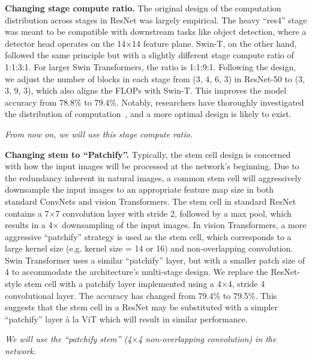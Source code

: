 \documentclass[10pt,twocolumn,letterpaper]{article}
\renewcommand{\paragraph}[1]{\vspace{1.25mm}\noindent\textbf{#1}}
\begin{document}
\paragraph{Changing stage compute ratio.} 
The original design of the computation distribution across stages in ResNet was largely empirical. The heavy ``res4'' stage was meant to be compatible with downstream tasks like object detection, where a detector head operates on the 14$\times$14 feature plane. 
Swin-T, on the other hand, followed the same principle but with a slightly different stage compute ratio of 1:1:3:1. For larger Swin Transformers, the ratio is 1:1:9:1. Following the design, we adjust the number of blocks in each stage from (3, 4, 6, 3) in ResNet-50 to (3, 3, 9, 3), which also aligns the FLOPs with Swin-T. This improves the model accuracy from 78.8\% to 79.4\%. Notably, researchers have thoroughly investigated the distribution of computation~\cite{Radosavovic2019network, Radosavovic2020designing}, and a more optimal design is likely to exist. 

\textit{From now on, we will use this stage compute ratio.} 

\paragraph{Changing stem to ``Patchify''.}
Typically, the stem cell design is concerned with how the input images will be processed at the network's beginning. Due to the redundancy inherent in natural images, a common stem cell will aggressively downsample the input images to an appropriate feature map size in both standard ConvNets and vision Transformers. The stem cell in standard ResNet contains a 7$\times$7 convolution layer with stride 2, followed by a max pool, which results in a 4$\times$ downsampling of the input images. In vision Transformers, a more aggressive ``patchify'' strategy is used as the stem cell, which corresponds to a large kernel size (e.g. kernel size = 14 or 16) and non-overlapping convolution. Swin Transformer uses a similar ``patchify'' layer, but with a smaller patch size of 4 to accommodate the architecture's multi-stage design. 
We replace the ResNet-style stem cell with a patchify layer implemented using a 4$\times$4, stride 4 convolutional layer. The accuracy has changed from 79.4\% to 79.5\%. This suggests that the stem cell in a ResNet may be substituted with a simpler ``patchify'' layer à la ViT which will result in similar performance.

\textit{We will use the ``patchify stem'' (4$\times$4 non-overlapping convolution) in the network.} 
\end{document}
